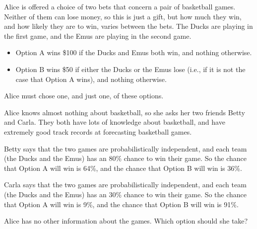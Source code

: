 \documentclass[11pt,]{article}
\providecommand{\tightlist}{%
  \setlength{\itemsep}{0pt}\setlength{\parskip}{0pt}}
\begin{document}
Alice is offered a choice of two bets that concern a pair of basketball
games. Neither of them can lose money, so this is just a gift, but how
much they win, and how likely they are to win, varies between the bets.
The Ducks are playing in the first game, and the Emus are playing in the
second game.

\begin{itemize}
\tightlist
\item
  Option A wins \$100 if the Ducks and Emus both win, and nothing
  otherwise.
\item
  Option B wins \$50 if either the Ducks or the Emus lose (i.e., if it
  is not the case that Option A wins), and nothing otherwise.
\end{itemize}

Alice must chose one, and just one, of these options.

Alice knows almost nothing about basketball, so she asks her two friends
Betty and Carla. They both have lots of knowledge about basketball, and
have extremely good track records at forecasting basketball games.

Betty says that the two games are probabilistically independent, and
each team (the Ducks and the Emus) has an 80\% chance to win their game.
So the chance that Option A will win is 64\%, and the chance that Option
B will win is 36\%.

Carla says that the two games are probabilistically independent, and
each team (the Ducks and the Emus) has an 30\% chance to win their game.
So the chance that Option A will win is 9\%, and the chance that Option
B will win is 91\%.

Alice has no other information about the games. Which option should she
take?
\end{document}

